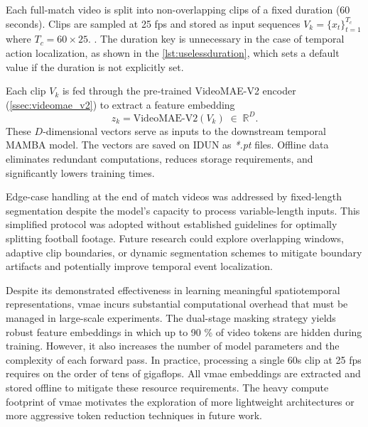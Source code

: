 Each full-match video is split into non-overlapping clips of a fixed duration (60 seconds). Clips are sampled at 25 fps and stored as input sequences $V_k=\{x_t\}_{t=1}^{T_c}$ where $T_c=60\times25$. . The duration key is unnecessary in the case of temporal action localization, as shown in the \autoref{lst:uselessduration}, which sets a default value if the duration is not explicitly set. 



Each clip $V_k$ is fed through the pre‐trained VideoMAE-V2 encoder (\autoref{ssec:videomae_v2}) to extract a feature embedding
\[
z_k = \mathrm{VideoMAE\text{-}V2}(V_k)\;\in\;\mathbb{R}^D.
\]
These $D$‐dimensional vectors serve as inputs to the downstream temporal MAMBA model. The vectors are saved on IDUN as \textit{*.pt} files. Offline data eliminates redundant computations, reduces storage requirements, and significantly lowers training times. 

Edge-case handling at the end of match videos was addressed by fixed-length segmentation despite the model's capacity to process variable-length inputs. This simplified protocol was adopted without established guidelines for optimally splitting football footage.  Future research could explore overlapping windows, adaptive clip boundaries, or dynamic segmentation schemes to mitigate boundary artifacts and potentially improve temporal event localization. 

Despite its demonstrated effectiveness in learning meaningful spatiotemporal representations, \acrlong{vmae} incurs substantial computational overhead that must be managed in large-scale experiments. The dual-stage masking strategy yields robust feature embeddings in which up to 90 \% of video tokens are hidden during training. However, it also increases the number of model parameters and the complexity of each forward pass. In practice, processing a single 60s clip at 25 fps requires on the order of tens of gigaflops\cite{wang_videomae_2023}. All \acrlong{vmae} embeddings are extracted and stored offline to mitigate these resource requirements. The heavy compute footprint of \acrlong{vmae} motivates the exploration of more lightweight architectures or more aggressive token reduction techniques in future work. 

